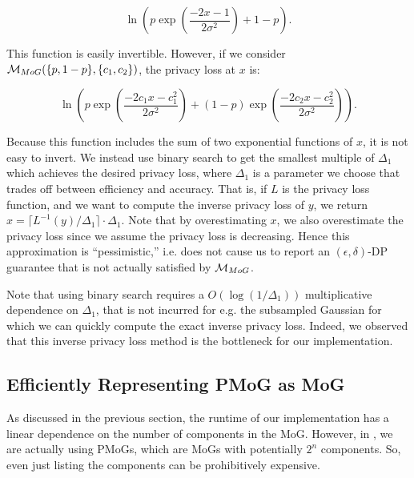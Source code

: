 \[\ln\left(p \exp\left(\frac{-2x-1}{2\sigma^2}\right) + 1 - p\right).\]

This function is easily invertible. However, if we consider $\mathcal{M}_{MoG}(\{p, 1-p\}, \{c_1, c_2\})$, the privacy loss at $x$ is:

\[\ln\left(p \exp\left(\frac{-2c_1x-c_1^2}{2\sigma^2}\right) + (1-p)\exp\left(\frac{-2c_2x-c_2^2}{2\sigma^2}\right)\right).\]

Because this function includes the sum of two exponential functions of $x$, it is not easy to invert. We instead use binary search to get the smallest multiple of $\Delta_1$ which achieves the desired privacy loss, where $\Delta_1$ is a parameter we choose that trades off between efficiency and accuracy. That is, if $L$ is the privacy loss function, and we want to compute the inverse privacy loss of $y$, we return $x = \lceil L^{-1}(y) / \Delta_1 \rceil \cdot \Delta_1$.
Note that by overestimating $x$, we also overestimate the privacy loss since we assume the privacy loss is decreasing. Hence this approximation is ``pessimistic,'' i.e. does not cause us to report an $(\epsilon, \delta)$-DP guarantee that is not actually satisfied by $\mathcal{M}_{MoG}$.

Note that using binary search requires a $O(\log(1/\Delta_1))$ multiplicative dependence on $\Delta_1$, that is not incurred for e.g. the subsampled Gaussian for which we can quickly compute the exact inverse privacy loss. Indeed, we observed that this inverse privacy loss method is the bottleneck for our implementation.

\subsection{Efficiently Representing PMoG as MoG}

As discussed in the previous section, the runtime of our implementation has a linear dependence on the number of components in the MoG. However, in \CPTB{}, we are actually using PMoGs, which are MoGs with potentially $2^n$ components. So, even just listing the components can be prohibitively expensive.

